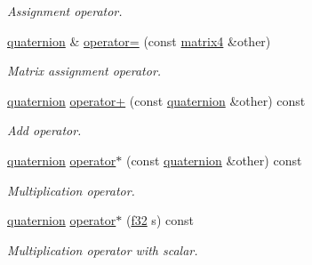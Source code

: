 \begin{DoxyCompactItemize}
\begin{DoxyCompactList}\small\item\em Assignment operator. \end{DoxyCompactList}\item 
\mbox{\label{classirr_1_1core_1_1quaternion_ae8323359cea70e5eafcac1cddaabf0cf}} 
\hyperlink{classirr_1_1core_1_1quaternion}{quaternion} \& \hyperlink{classirr_1_1core_1_1quaternion_ae8323359cea70e5eafcac1cddaabf0cf}{operator=} (const \hyperlink{namespaceirr_1_1core_a4c9d4e29899535971052810954a14431}{matrix4} \&other)
\begin{DoxyCompactList}\small\item\em Matrix assignment operator. \end{DoxyCompactList}\item 
\mbox{\label{classirr_1_1core_1_1quaternion_a873b5380189dde9139aa732eb00fbc78}} 
\hyperlink{classirr_1_1core_1_1quaternion}{quaternion} \hyperlink{classirr_1_1core_1_1quaternion_a873b5380189dde9139aa732eb00fbc78}{operator+} (const \hyperlink{classirr_1_1core_1_1quaternion}{quaternion} \&other) const
\begin{DoxyCompactList}\small\item\em Add operator. \end{DoxyCompactList}\item 
\mbox{\label{classirr_1_1core_1_1quaternion_af0703c31757886f8ecdf33d4247923cd}} 
\hyperlink{classirr_1_1core_1_1quaternion}{quaternion} \hyperlink{classirr_1_1core_1_1quaternion_af0703c31757886f8ecdf33d4247923cd}{operator$\ast$} (const \hyperlink{classirr_1_1core_1_1quaternion}{quaternion} \&other) const
\begin{DoxyCompactList}\small\item\em Multiplication operator. \end{DoxyCompactList}\item 
\mbox{\label{classirr_1_1core_1_1quaternion_a31b25675aeb459bd052f29c440c791c3}} 
\hyperlink{classirr_1_1core_1_1quaternion}{quaternion} \hyperlink{classirr_1_1core_1_1quaternion_a31b25675aeb459bd052f29c440c791c3}{operator$\ast$} (\hyperlink{namespaceirr_a0277be98d67dc26ff93b1a6a1d086b07}{f32} s) const
\begin{DoxyCompactList}\small\item\em Multiplication operator with scalar. \end{DoxyCompactList}\item 

\end{DoxyCompactItemize}
